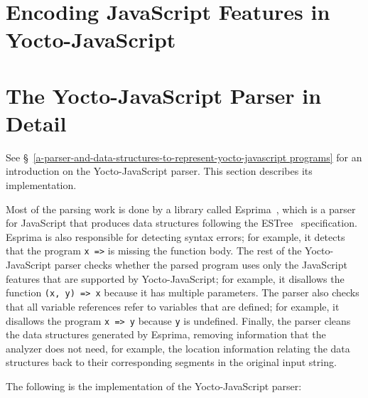 \documentclass[12pt, oneside]{book}
\begin{document}
\appendix

\chapter{Encoding JavaScript Features in Yocto-JavaScript}
\label{encoding-javascript-features-in-yocto-javascript}


\chapter{The Yocto-JavaScript Parser in Detail}
\label{the-yocto-javascript-parser-in-detail}

See §~\ref{a-parser-and-data-structures-to-represent-yocto-javascript programs} for an introduction on the Yocto-JavaScript parser. This section describes its implementation.

Most of the parsing work is done by a library called Esprima~\cite{esprima}, which is a parser for JavaScript that produces data structures following the ESTree~\cite{estree} specification. Esprima is also responsible for detecting syntax errors; for example, it detects that the program \texttt{x =>} is missing the function body. The rest of the Yocto-JavaScript parser checks whether the parsed program uses only the JavaScript features that are supported by Yocto-JavaScript; for example, it disallows the function \texttt{(x, y) => x} because it has multiple parameters. The parser also checks that all variable references refer to variables that are defined; for example, it disallows the program \texttt{x => y} because \texttt{y} is undefined. Finally, the parser cleans the data structures generated by Esprima, removing information that the analyzer does not need, for example, the location information relating the data structures back to their corresponding segments in the original input string.

The following is the implementation of the Yocto-JavaScript parser:
\end{document}
